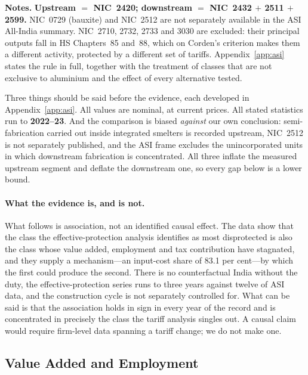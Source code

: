 \begin{table}[H]
    \vspace{0.2cm}
    \raggedright
    \small \textbf{Notes.} \textbf{Upstream $=$ NIC~2420; downstream $=$ NIC~2432 $+$ 2511 $+$ 2599.} NIC~0729 (bauxite) and NIC~2512 are not separately available in the ASI All-India summary. NIC~2710, 2732, 2733 and 3030 are excluded: their principal outputs fall in HS Chapters~85 and~88, which on Corden's criterion makes them a different activity, protected by a different set of tariffs. Appendix~\ref{app:asi} states the rule in full, together with the treatment of classes that are not exclusive to aluminium and the effect of every alternative tested.
\end{table}

Three things should be said before the evidence, each developed in Appendix~\ref{app:asi}. All values are nominal, at current prices. All stated statistics run to \textbf{2022--23}. And the comparison is biased \emph{against} our own conclusion: semi-fabrication carried out inside integrated smelters is recorded upstream, NIC~2512 is not separately published, and the ASI frame excludes the unincorporated units in which downstream fabrication is concentrated. All three inflate the measured upstream segment and deflate the downstream one, so every gap below is a lower bound.

\paragraph{What the evidence is, and is not.} What follows is association, not an identified causal effect. The data show that the class the effective-protection analysis identifies as most disprotected is also the class whose value added, employment and tax contribution have stagnated, and they supply a mechanism---an input-cost share of 83.1 per cent---by which the first could produce the second. There is no counterfactual India without the duty, the effective-protection series runs to three years against twelve of ASI data, and the construction cycle is not separately controlled for. What can be said is that the association holds in sign in every year of the record and is concentrated in precisely the class the tariff analysis singles out. A causal claim would require firm-level data spanning a tariff change; we do not make one.

\subsection{Value Added and Employment}

